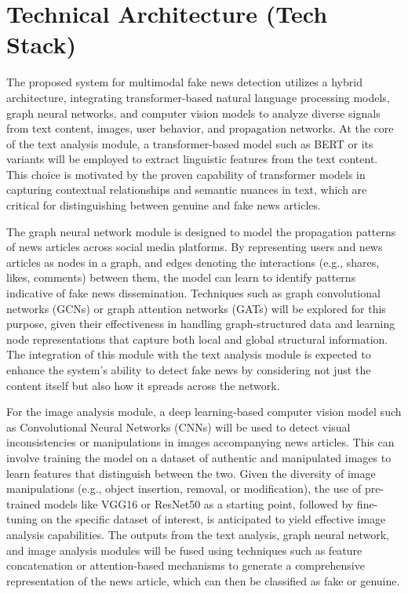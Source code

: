 \documentclass[conference]{IEEEtran}
\begin{document}
\section{Technical Architecture (Tech Stack)}
The proposed system for multimodal fake news detection utilizes a hybrid architecture, integrating transformer-based natural language processing models, graph neural networks, and computer vision models to analyze diverse signals from text content, images, user behavior, and propagation networks. At the core of the text analysis module, a transformer-based model such as BERT or its variants will be employed to extract linguistic features from the text content. This choice is motivated by the proven capability of transformer models in capturing contextual relationships and semantic nuances in text, which are critical for distinguishing between genuine and fake news articles.

The graph neural network module is designed to model the propagation patterns of news articles across social media platforms. By representing users and news articles as nodes in a graph, and edges denoting the interactions (e.g., shares, likes, comments) between them, the model can learn to identify patterns indicative of fake news dissemination. Techniques such as graph convolutional networks (GCNs) or graph attention networks (GATs) will be explored for this purpose, given their effectiveness in handling graph-structured data and learning node representations that capture both local and global structural information. The integration of this module with the text analysis module is expected to enhance the system's ability to detect fake news by considering not just the content itself but also how it spreads across the network.

For the image analysis module, a deep learning-based computer vision model such as Convolutional Neural Networks (CNNs) will be used to detect visual inconsistencies or manipulations in images accompanying news articles. This can involve training the model on a dataset of authentic and manipulated images to learn features that distinguish between the two. Given the diversity of image manipulations (e.g., object insertion, removal, or modification), the use of pre-trained models like VGG16 or ResNet50 as a starting point, followed by fine-tuning on the specific dataset of interest, is anticipated to yield effective image analysis capabilities. The outputs from the text analysis, graph neural network, and image analysis modules will be fused using techniques such as feature concatenation or attention-based mechanisms to generate a comprehensive representation of the news article, which can then be classified as fake or genuine.
\end{document}
